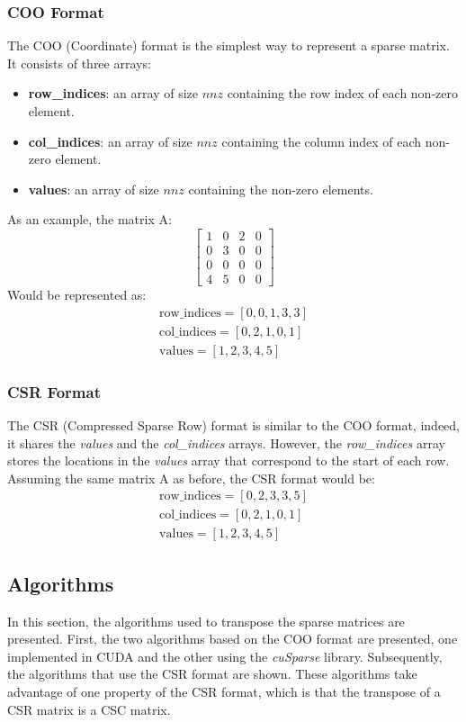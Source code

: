 \documentclass{IEEEconf}
\begin{document}
\subsubsection{COO Format}
The COO (Coordinate) format is the simplest way to represent a sparse matrix. It consists of three arrays:
\begin{itemize}
    \item \textbf{row\_indices}: an array of size $nnz$ containing the row index of each non-zero element.
    \item \textbf{col\_indices}: an array of size $nnz$ containing the column index of each non-zero element.
    \item \textbf{values}: an array of size $nnz$ containing the non-zero elements.
\end{itemize}
As an example, the matrix A:
\[
\begin{bmatrix}
    1 & 0 & 2 & 0 \\
    0 & 3 & 0 & 0 \\
    0 & 0 & 0 & 0 \\
    4 & 5 & 0 & 0
\end{bmatrix}
\]
Would be represented as:
\begin{align*}
    \text{row\_indices} = [0, 0, 1, 3, 3] \\
    \text{col\_indices} = [0, 2, 1, 0, 1] \\
    \text{values} = [1, 2, 3, 4, 5]
\end{align*}
\subsubsection{CSR Format}
The CSR (Compressed Sparse Row) format is similar to the COO format, indeed, it shares the \textit{values}
and the \textit{col\_indices} arrays. However, the \textit{row\_indices} array stores the locations
in the \textit{values} array that correspond to the start of each row.
Assuming the same matrix A as before, the CSR format would be:
\begin{align*}
    \text{row\_indices} = [0, 2, 3, 3, 5] \\
    \text{col\_indices} = [0, 2, 1, 0, 1] \\
    \text{values} = [1, 2, 3, 4, 5]
\end{align*}
\subsection{Algorithms}
In this section, the algorithms used to transpose the sparse matrices are presented.
First, the two algorithms based on the COO format are presented, one implemented in CUDA and the other using the \textit{cuSparse} library.
Subsequently, the algorithms that use the CSR format are shown. These algorithms take advantage of one property of the CSR format, which is that
the transpose of a CSR matrix is a CSC matrix.
\end{document}
